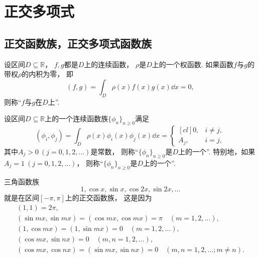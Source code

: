 \section{正交多项式}
\subsection{正交函数族，正交多项式函数族}
\begin{definition}
设区间\(D \subseteq \mathbb{R}\)，
\(f,g\)都是\(D\)上的连续函数，
\(\rho\)是\(D\)上的一个权函数.
如果函数\(f\)与\(g\)的带权\(\rho\)的内积为零，
即\begin{equation*}
	(f,g)
	= \int_D \rho(x) f(x) g(x) \dd{x}
	= 0,
\end{equation*}
则称“\(f\)与\(g\)在\(D\)上”.
\end{definition}

\begin{definition}
设区间\(D \subseteq \mathbb{R}\)上的一个连续函数族\(\{\phi_n\}_{n\geq0}\)满足\begin{equation*}
	(\phi_i,\phi_j)
	= \int_D \rho(x) \phi_i(x) \phi_j(x) \dd{x}
	= \begin{cases}[cl]
		0, & i \neq j, \\
		A_j, & i = j,
	\end{cases}
\end{equation*}
其中\(A_j > 0\ (j=0,1,2,\dotsc)\)是常数，
则称“\(\{\phi_n\}_{n\geq0}\)是\(D\)上的一个”.
特别地，如果\(A_j = 1\ (j=0,1,2,\dotsc)\)，
则称“\(\{\phi_n\}_{n\geq0}\)是\(D\)上的一个”.
\end{definition}

\begin{example}
三角函数族\begin{equation*}
	1,\cos x,\sin x,\cos2x,\sin2x,\dotsc
\end{equation*}
就是在区间\([-\pi,\pi]\)上的正交函数族，
这是因为\begin{gather*}
	(1,1) = 2\pi, \\
	(\sin m x,\sin m x)
	= (\cos m x,\cos m x)
	= \pi
	\quad(m=1,2,\dotsc), \\
	(1,\cos m x)
	= (1,\sin m x)
	= 0
	\quad(m=1,2,\dotsc), \\
	(\cos m x,\sin n x)
	= 0
	\quad(m,n=1,2,\dotsc), \\
	(\cos m x,\cos n x)
	= (\sin m x,\sin n x)
	= 0
	\quad(m,n=1,2,\dotsc;m \neq n).
\end{gather*}
\end{example}


